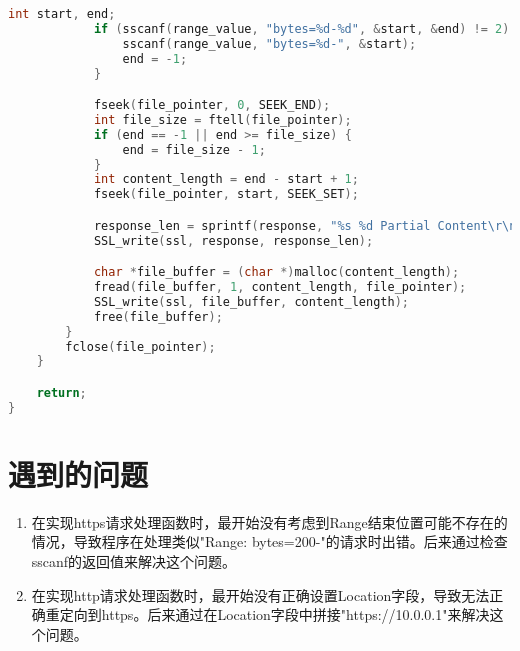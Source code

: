 \documentclass[11pt]{article}
\begin{document}
\begin{lstlisting}[language=C]
            int start, end;
            if (sscanf(range_value, "bytes=%d-%d", &start, &end) != 2) {
                sscanf(range_value, "bytes=%d-", &start);
                end = -1;
            }

            fseek(file_pointer, 0, SEEK_END);
            int file_size = ftell(file_pointer);
            if (end == -1 || end >= file_size) {
                end = file_size - 1;
            }
            int content_length = end - start + 1;
            fseek(file_pointer, start, SEEK_SET);

            response_len = sprintf(response, "%s %d Partial Content\r\nContent-Length: %d\r\nContent-Range: bytes %d-%d/%d\r\n\r\n", http_request->line.version, Partial_Content, content_length, start, end, file_size);
            SSL_write(ssl, response, response_len);

            char *file_buffer = (char *)malloc(content_length);
            fread(file_buffer, 1, content_length, file_pointer);
            SSL_write(ssl, file_buffer, content_length);
            free(file_buffer);
        }
        fclose(file_pointer);
    }

    return;
}
\end{lstlisting}

\section{遇到的问题}

\begin{enumerate}
  \item 在实现https请求处理函数时，最开始没有考虑到Range结束位置可能不存在的情况，导致程序在处理类似"Range: bytes=200-"的请求时出错。后来通过检查sscanf的返回值来解决这个问题。
  \item 在实现http请求处理函数时，最开始没有正确设置Location字段，导致无法正确重定向到https。后来通过在Location字段中拼接"https://10.0.0.1"来解决这个问题。
\end{enumerate}
\end{document}
